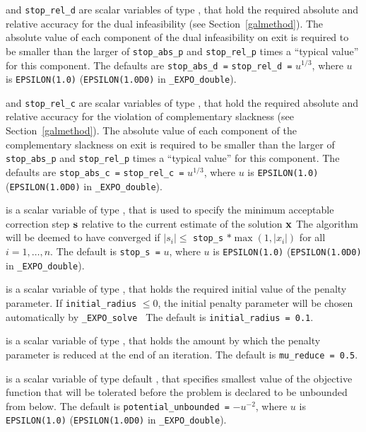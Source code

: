 \documentclass{galahad}
\newcommand{\packagename}{EXPO}
\newcommand{\fullpackagename}{\libraryname\_\packagename}
\newcommand{\solver}{{\tt \fullpackagename\_solve}}
\begin{document}
\begin{description}
 and {\tt stop\_rel\_d}
are scalar variables of type \realdp, that hold the
required absolute and relative accuracy for the dual infeasibility
(see Section~\ref{galmethod}).
The absolute value of each component of the dual infeasibility
on exit is required to be smaller than the larger of {\tt stop\_abs\_p} and
{\tt stop\_rel\_p} times a ``typical value'' for this component.
The defaults are {\tt stop\_abs\_d =} {\tt stop\_rel\_d =} $u^{1/3}$,
where $u$ is {\tt EPSILON(1.0)} ({\tt EPSILON(1.0D0)} in
{\tt \fullpackagename\_double}).

 and {\tt stop\_rel\_c}
are scalar variables of type \realdp, that hold the required absolute and 
relative accuracy for the violation of complementary slackness
(see Section~\ref{galmethod}).
The absolute value of each component of the complementary slackness
on exit is required to be smaller than the larger of {\tt stop\_abs\_p} and
{\tt stop\_rel\_p} times a ``typical value'' for this component.
The defaults are {\tt stop\_abs\_c =} {\tt stop\_rel\_c =} $u^{1/3}$,
where $u$ is {\tt EPSILON(1.0)} ({\tt EPSILON(1.0D0)} in
{\tt \fullpackagename\_double}).

 is a scalar variable of type \realdp,
that is used to specify the minimum acceptable correction step ${\mathbf{s}}$
relative to the current estimate of the solution ${\mathbf{x}}$
The algorithm will be deemed to have converged if $|s_i| \leq$
{\tt stop\_s} $\ast \max( 1, |x_i|)$ for all $i = 1, \ldots, n$.
The default is {\tt stop\_s =} $u$,
where $u$ is {\tt EPSILON(1.0)} ({\tt EPSILON(1.0D0)} in
{\tt \fullpackagename\_double}).

 is a scalar variable of type \realdp, that holds
the required initial value of the penalty parameter. If
{\tt initial\_radius} $\leq 0$, the initial penalty parameter will be 
chosen automatically by \solver\
The default is {\tt initial\_radius = 0.1}.

 is a scalar variable of type \realdp, that holds
the amount by which the penalty parameter is reduced at the end of 
an iteration.
The default is {\tt mu\_reduce = 0.5}.

 is a scalar variable of type default \realdp, that 
specifies smallest
value of the objective function that will be tolerated before the problem
is declared to be unbounded from below.
The default is {\tt potential\_u\-nbounded =} $-u^{-2}$,
where $u$ is {\tt EPSILON(1.0)} ({\tt EPSILON(1.0D0)} in
{\tt \fullpackagename\_double}).


\end{description}
\end{document}
